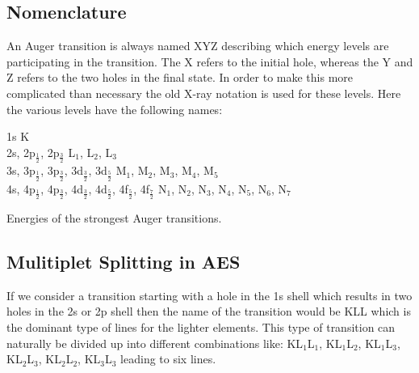           \subsection{Nomenclature}
          An Auger transition is always  named  XYZ  describing  which
          energy levels are participating  in  the  transition.  The  X
          refers to the initial hole, whereas the Y and  Z  refers  to
          the two holes in the final state. In order to make this more
          complicated than necessary the old X-ray  notation  is  used
          for these levels. Here the various levels have the  following
          names:

\vspace{0.5cm}

             \noindent   1s   \hfill   K\\   2s,   2p$_{\frac{1}{2}}$,
          2p$_{\frac{3}{2}}$ \hfill L$_{1}$,  L$_{2}$,  L$_{3}$\\  3s,
          3p$_{\frac{1}{2}}$, 3p$_{\frac{3}{2}}$,  3d$_{\frac{3}{2}}$,
          3d$_{\frac{5}{2}}$   \hfill   M$_{1}$,   M$_{2}$,   M$_{3}$,
          M$_{4}$,       M$_{5}$\\       4s,       4p$_{\frac{1}{2}}$,
          4p$_{\frac{3}{2}}$, 4d$_{\frac{3}{2}}$,  4d$_{\frac{5}{2}}$,
          4f$_{\frac{5}{2}}$,   4f$_{\frac{7}{2}}$   \hfill   N$_{1}$,
          N$_{2}$,  N$_{3}$,  N$_{4}$,  N$_{5}$,  N$_{6}$,   N$_{7}$\\


         \newpage
          \vspace*{14cm}

            Energies  of  the  strongest
          Auger transitions.


          \subsection{Mulitiplet Splitting in AES}

             If we consider a transition starting with  a  hole  in
          the 1s shell which  results in two holes in  the  2s
          or 2p shell then the name of the  transition  would  be  KLL
          which  is  the  dominant  type  of  lines  for  the  lighter
          elements. This type of transition can naturally  be  divided
          up  into   different   combinations   like:   KL$_{1}$L$_{1}$,
          KL$_{1}$L$_{2}$,      KL$_{1}$L$_{3}$,      KL$_{2}$L$_{3}$,
          KL$_{2}$L$_{2}$, KL$_{3}$L$_{3}$ leading to six lines.

